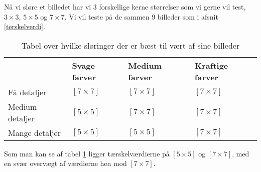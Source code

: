 Nå vi sløre et billedet har vi 3 forskellige kerne størrelser som vi
gerne vil test, $3 \times 3$, $5 \times 5$ og $7 \times 7$. Vi vil teste
på de sammen 9 billeder som i afsnit \ref{terskelverdi}.

\begin{table}[!h]
    \centering
    \begin{tabular}{| l | l | l | l |} \hline
                            & Svage farver	& Medium farver	& Kraftige farver 	\\ \hline
        Få detaljer 		& $[7 \times 7]$	& $[7 \times 7]$	& $[7 \times 7]$		\\ \hline
        Medium detaljer 	& $[5 \times 5]$	& $[7 \times 7]$	& $[7 \times 7]$		\\ \hline
        Mange detaljer		& $[5 \times 5]$	& $[5 \times 5]$	& $[7 \times 7]$		\\ \hline
    \end{tabular}
    \caption{Tabel over hvilke sløringer der er bæst til vært af sine billeder}
    \label{sloringTabel}
\end{table}

Som man kan se af tabel \ref{sloringTabel} ligger tærskelværdierne på
$[5 \times 5]$ og $[7 \times 7]$, med en svær overvægt af værdierne hen
mod $[7 \times 7]$.
